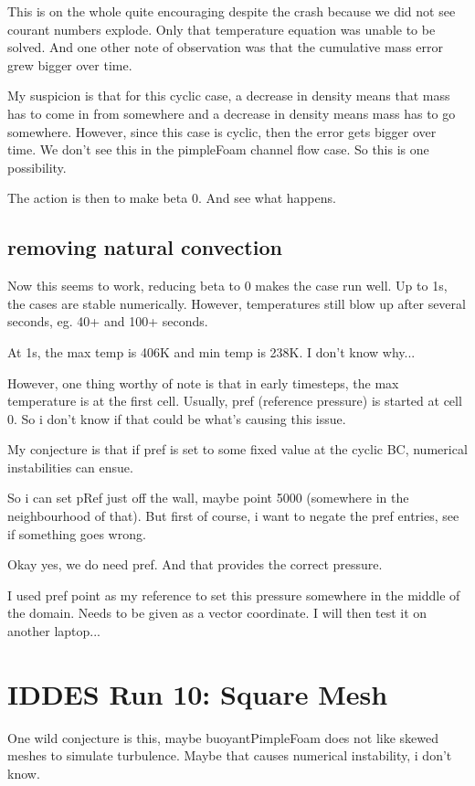 \documentclass[12pt]{article}
\renewcommand{\_}{\kern-1.5pt\textunderscore\kern-1.5pt}
\begin{document}
This is on the whole quite encouraging despite the crash because we did not see courant numbers explode. Only that temperature equation was unable to be solved. And one other note of observation was that the cumulative mass error grew bigger over time.

My suspicion is that for this cyclic case, a decrease in density means that mass has to come in from somewhere and a decrease in density means mass has to go somewhere. However, since this case is cyclic, then the error gets bigger over time. We don't see this in the pimpleFoam channel flow case. So this is one possibility. 

The action is then to make beta 0. And see what happens.

\subsection{removing natural convection}

Now this seems to work, reducing beta to 0 makes the case run well. Up to 1s, the cases are stable numerically. However, temperatures still blow up after several seconds, eg. 40+ and 100+ seconds.


At 1s, the max temp is 406K and min temp is 238K. I don't know why...

However, one thing worthy of note is that in early timesteps, the max temperature is at the first cell. Usually, pref (reference pressure) is started at cell 0. So i don't know if that could be what's causing this issue.

My conjecture is that if pref is set to some fixed value at the cyclic BC, numerical instabilities can ensue.

So i can set pRef just off the wall, maybe point 5000 (somewhere in the neighbourhood of that). But first of course, i want to negate the pref entries, see if something goes wrong.

Okay yes, we do need pref. And that provides the correct pressure.

I used pref point as my reference to set this pressure somewhere in the middle of the domain. Needs to be given as a vector coordinate. I will then test it on another laptop...


\section{IDDES Run 10: Square Mesh}

One wild conjecture is this, maybe buoyantPimpleFoam does not like skewed meshes to simulate turbulence. Maybe that causes numerical instability, i don't know. 
\end{document}

